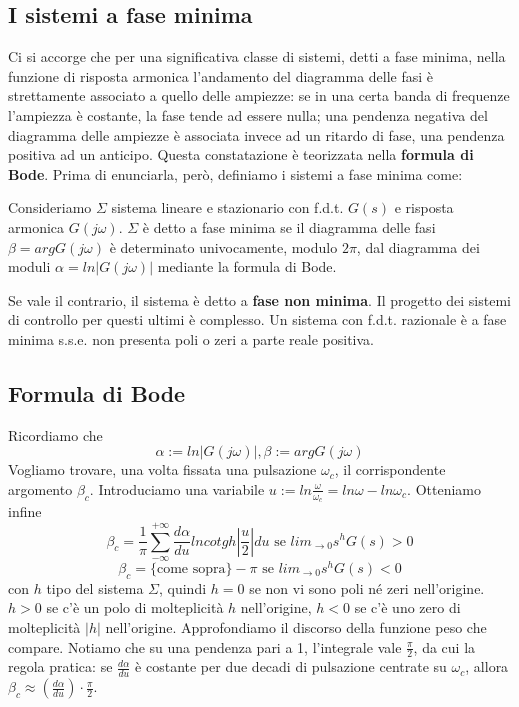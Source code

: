 \documentclass[11pt]{article}
\begin{document}
\subsection{I sistemi a fase minima}
Ci si accorge che per una significativa classe di sistemi, detti a fase minima, nella funzione di risposta armonica l'andamento del diagramma delle fasi è strettamente associato a quello delle ampiezze: se in una certa banda di frequenze l'ampiezza è costante, la fase tende ad essere nulla; una pendenza negativa del diagramma delle ampiezze è associata invece ad un ritardo di fase, una pendenza positiva ad un anticipo. 
Questa constatazione è teorizzata nella \textbf{formula di Bode}. Prima di enunciarla, però, definiamo i sistemi a fase minima come:
\begin{center}
    Consideriamo $\Sigma$ sistema lineare e stazionario con f.d.t. $G(s)$ e risposta armonica $G(j\omega)$. $\Sigma$ è detto a fase minima se il diagramma delle fasi $\beta=arg G(j\omega)$ è determinato univocamente, modulo $2\pi$, dal diagramma dei moduli $\alpha = ln|G(j\omega)|$ mediante la formula di Bode.
\end{center}
Se vale il contrario, il sistema è detto a \textbf{fase non minima}. Il progetto dei sistemi di controllo per questi ultimi è complesso. Un sistema con f.d.t. razionale è a fase minima s.s.e. non presenta poli o zeri a parte reale positiva.
\subsection{Formula di Bode}
Ricordiamo che
\begin{displaymath}
    \alpha := ln |G(j\omega)|, \beta := arg G(j\omega)
\end{displaymath}
Vogliamo trovare, una volta fissata una pulsazione $\omega_c$, il corrispondente argomento $\beta_c$. Introduciamo una variabile $u:=ln\frac{\omega}{\omega_c}=ln\omega-ln\omega_c$. Otteniamo infine 
\begin{displaymath}
    \beta_c = \frac{1}{\pi} \sum_{-\infty}^{+\infty}\frac{d\alpha}{du}ln cotgh|\frac{u}{2}|du \textrm{ se }lim_{\rightarrow0}s^h G(s)>0
\end{displaymath}
\begin{displaymath}
    \beta_c = \{\textrm{come sopra}\} - \pi \textrm{ se }lim_{\rightarrow0}s^h G(s)<0
\end{displaymath}
con $h$ tipo del sistema $\Sigma$, quindi $h=0$ se non vi sono poli né zeri nell'origine. $h>0$ se c'è un polo di molteplicità $h$ nell'origine, $h<0$ se c'è uno zero di molteplicità $|h|$ nell'origine.
Approfondiamo il discorso della funzione peso che compare. Notiamo che su una pendenza pari a 1, l'integrale vale $\frac{\pi}{2}$, da cui la regola pratica: se $\frac{d\alpha}{du}$ è costante per due decadi di pulsazione centrate su $\omega_c$, allora $\beta_c \approx \left(\frac{d\alpha}{du}\right)\cdot \frac{\pi}{2}$.
\end{document}
